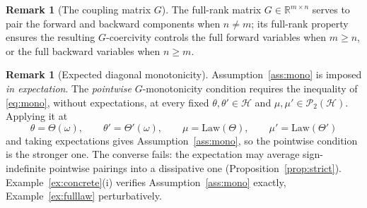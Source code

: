 \documentclass[preprint,12pt]{elsarticle}
\newcommand{\R}{\mathbb{R}}
\newcommand{\Law}{\mathrm{Law}}
\numberwithin{equation}{section}
\theoremstyle{plain}
\theoremstyle{definition}
\theoremstyle{\PaperRemarkStyle}
\newtheorem{remark}[theorem]{Remark}
\begin{document}
\begin{remark}[The coupling matrix $G$]\label{rem:G-pairing}
The full-rank matrix $G\in\R^{m\times n}$ serves to pair the forward and backward
components when $n\neq m$; its full-rank property ensures the resulting $G$-coercivity
controls the full forward variables when $m\ge n$, or the full backward variables when
$n\ge m$.
\end{remark}
\begin{remark}[Expected diagonal monotonicity]\label{rem:diag-mono}
Assumption~\ref{ass:mono} is imposed \emph{in expectation}. The \emph{pointwise}
$G$-monotonicity condition requires the inequality of \eqref{eq:mono}, without expectations,
at every fixed $\theta,\theta'\in\mathcal H$ and $\mu,\mu'\in\mathcal P_2(\mathcal H)$.
Applying it at
\[
\theta=\Theta(\omega),\qquad \theta'=\Theta'(\omega),\qquad
\mu=\Law(\Theta),\qquad \mu'=\Law(\Theta')
\]
and taking expectations gives Assumption~\ref{ass:mono}, so the
pointwise condition is the stronger one. The converse
fails: the expectation may average sign-indefinite pointwise pairings into a dissipative one
(Proposition~\ref{prop:strict}). Example~\ref{ex:concrete}(i) verifies
Assumption~\ref{ass:mono} exactly, Example~\ref{ex:fulllaw} perturbatively.
\end{remark}
\end{document}
